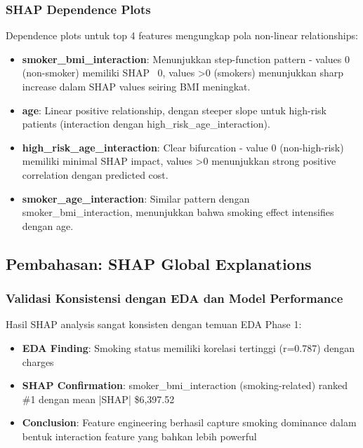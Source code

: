\subsubsection{SHAP Dependence Plots}

Dependence plots untuk top 4 features mengungkap pola non-linear relationships:

\begin{itemize}
    \item \textbf{smoker\_bmi\_interaction}: Menunjukkan step-function pattern - values 0 (non-smoker) memiliki SHAP ~0, values >0 (smokers) menunjukkan sharp increase dalam SHAP values seiring BMI meningkat.

    \item \textbf{age}: Linear positive relationship, dengan steeper slope untuk high-risk patients (interaction dengan high\_risk\_age\_interaction).

    \item \textbf{high\_risk\_age\_interaction}: Clear bifurcation - value 0 (non-high-risk) memiliki minimal SHAP impact, values >0 menunjukkan strong positive correlation dengan predicted cost.

    \item \textbf{smoker\_age\_interaction}: Similar pattern dengan smoker\_bmi\_interaction, menunjukkan bahwa smoking effect intensifies dengan age.
\end{itemize}

\subsection{Pembahasan: SHAP Global Explanations}
\label{subsec:shap-discussion}

\subsubsection{Validasi Konsistensi dengan EDA dan Model Performance}

Hasil SHAP analysis sangat konsisten dengan temuan EDA Phase 1:
\begin{itemize}
    \item \textbf{EDA Finding}: Smoking status memiliki korelasi tertinggi (r=0.787) dengan charges
    \item \textbf{SHAP Confirmation}: smoker\_bmi\_interaction (smoking-related) ranked \#1 dengan mean |SHAP| \$6,397.52
    \item \textbf{Conclusion}: Feature engineering berhasil capture smoking dominance dalam bentuk interaction feature yang bahkan lebih powerful
\end{itemize}

